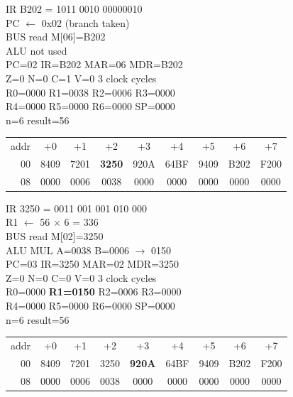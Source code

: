 \noindent\begin{tcolorbox}[stepbox, title={Step 12 \hfill PC 06 \quad BNE loop}]
\textcolor{dim}{IR} B202 = 1011 0010 00000010\\
PC $\leftarrow$ 0x02 (branch taken)\\
\textcolor{dim}{BUS} read M[06]=B202\\
\textcolor{dim}{ALU} \textcolor{dim}{not used}\\
PC=02 IR=B202 MAR=06 MDR=B202\\
Z=0 N=0 C=1 V=0 \hfill \textcolor{dim}{3 clock cycles}\\
R0=0000 R1=0038 R2=0006 R3=0000\\
R4=0000 R5=0000 R6=0000 SP=0000\\
\textcolor{dim}{n=6  result=56}\\[1pt]
{\setlength{\tabcolsep}{1.6pt}\begin{tabular}{@{}r*{8}{c}@{}}
\textcolor{dim}{addr} & \textcolor{dim}{+0} & \textcolor{dim}{+1} & \textcolor{dim}{+2} & \textcolor{dim}{+3} & \textcolor{dim}{+4} & \textcolor{dim}{+5} & \textcolor{dim}{+6} & \textcolor{dim}{+7}\\
\textcolor{dim}{00} & 8409 & 7201 & \cellcolor{pcc}\textbf{3250} & 920A & 64BF & 9409 & B202 & F200\\
\textcolor{dim}{08} & 0000 & \cellcolor{datac}0006 & \cellcolor{datac}0038 & 0000 & 0000 & 0000 & 0000 & 0000\\
\end{tabular}}
\end{tcolorbox}\hfill\begin{tcolorbox}[stepbox, title={Step 13 \hfill PC 02 \quad MUL R1, R1, R2}]
\textcolor{dim}{IR} 3250 = 0011 001 001 010 000\\
R1 $\leftarrow$ 56 $\times$ 6 = 336\\
\textcolor{dim}{BUS} read M[02]=3250\\
\textcolor{dim}{ALU} MUL A=0038 B=0006 $\rightarrow$ 0150\\
PC=03 IR=3250 MAR=02 MDR=3250\\
Z=0 N=0 C=0 V=0 \hfill \textcolor{dim}{3 clock cycles}\\
R0=0000 \textcolor{wrt}{\textbf{R1=0150}} R2=0006 R3=0000\\
R4=0000 R5=0000 R6=0000 SP=0000\\
\textcolor{dim}{n=6  result=56}\\[1pt]
{\setlength{\tabcolsep}{1.6pt}\begin{tabular}{@{}r*{8}{c}@{}}
\textcolor{dim}{addr} & \textcolor{dim}{+0} & \textcolor{dim}{+1} & \textcolor{dim}{+2} & \textcolor{dim}{+3} & \textcolor{dim}{+4} & \textcolor{dim}{+5} & \textcolor{dim}{+6} & \textcolor{dim}{+7}\\
\textcolor{dim}{00} & 8409 & 7201 & 3250 & \cellcolor{pcc}\textbf{920A} & 64BF & 9409 & B202 & F200\\
\textcolor{dim}{08} & 0000 & \cellcolor{datac}0006 & \cellcolor{datac}0038 & 0000 & 0000 & 0000 & 0000 & 0000\\
\end{tabular}}
\end{tcolorbox}\par\vspace{3pt}
